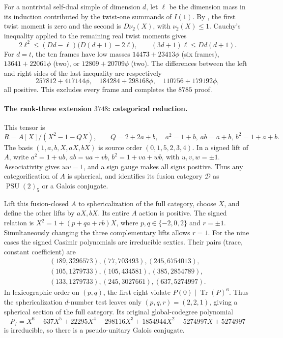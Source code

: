 For a nontrivial self-dual simple of dimension $d$, let $\ell$ be the
dimension mass in its induction contributed by the twist-one summands
of $I(1)$. By \cite[Theorems~2.5 and~2.7]{Ostrik3}, the first twist
moment is zero and the second is $D\nu_2(X)$, with $\nu_2(X)\le1$.
Cauchy's inequality applied to the remaining real twist moments gives
\[
 2\ell^2\le(Dd-\ell)\bigl(D(d+1)-2\ell\bigr),\qquad
 (3d+1)\ell\le Dd(d+1).
\]
For $d=t$, the ten frames have low masses
$14473+23413\phi$ (six frames), $13641+22061\phi$ (two), or
$12809+20709\phi$ (two). The differences between the left and right
sides of the last inequality are respectively
\[
 257812+417144\phi,\quad184284+298168\phi,\quad110756+179192\phi,
\]
all positive. This excludes every frame and completes the $8785$ proof.

\paragraph{The rank-three extension $3748$: categorical reduction.}
This tensor is
\[
 R=A[X]/(X^2-1-QX),\qquad Q=2+2a+b,
 \quad a^2=1+b,\ ab=a+b,\ b^2=1+a+b.
\]
The basis $(1,a,b,X,aX,bX)$ is source order $(0,1,5,2,3,4)$.
In a signed lift of $A$, write
$a^2=1+ub$, $ab=ua+vb$, $b^2=1+va+wb$, with $u,v,w=\pm1$.
Associativity gives $uw=1$, and a sign gauge makes all signs positive.
Thus any categorification of $A$ is spherical, and
\cite[Theorem~1.1]{Ostrik3} identifies its fusion category
$\mathcal D$ as $\operatorname{PSU}(2)_5$ or a Galois conjugate.

Lift this fusion-closed $A$ to sphericalization of the full category,
choose $X$, and define the other lifts by $aX,bX$. Its entire $A$ action
is positive. The signed relation is
$X^2=1+(p+qa+rb)X$, where $p,q\in\{-2,0,2\}$ and $r=\pm1$.
Simultaneously changing the three complementary lifts allows $r=1$.
For the nine cases the signed Casimir polynomials are irreducible
sextics. Their pairs (trace, constant coefficient) are
\[
\begin{gathered}
 (189,3296573),(77,703493),(245,6754013),\\
 (105,1279733),(105,434581),(385,2854789),\\
 (133,1279733),(245,3027661),(637,5274997).
\end{gathered}
\]
In lexicographic order on $(p,q)$, the first eight violate
$P(0)\mid\operatorname{Tr}(P)^6$. Thus the sphericalization
$d$-number test leaves only $(p,q,r)=(2,2,1)$, giving a spherical
section of the full category. Its original global-codegree polynomial
\[
 P_f=X^6-637X^5+22295X^4-298116X^3
        +1854944X^2-5274997X+5274997
\]
is irreducible, so there is a pseudo-unitary Galois conjugate.

